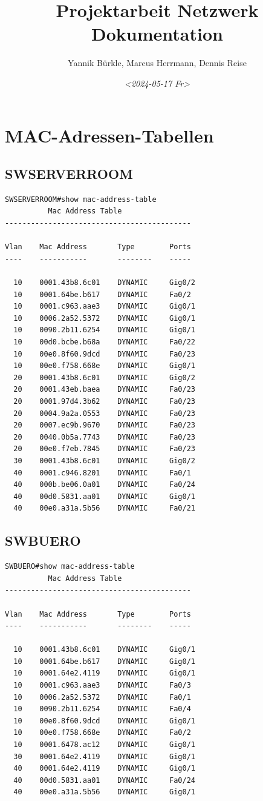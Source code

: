 \documentclass[11pt]{article}
\author{Yannik Bürkle, Marcus Herrmann, Dennis Reise}
\date{\textit{<2024-05-17 Fr>}}
\title{Projektarbeit Netzwerk Dokumentation}
\begin{document}
\maketitle
\tableofcontents

\section{MAC-Adressen-Tabellen}
\label{sec:org6f036d5}
\subsection{SWSERVERROOM}
\label{sec:org0246152}
\begin{verbatim}
SWSERVERROOM#show mac-address-table
          Mac Address Table
-------------------------------------------

Vlan    Mac Address       Type        Ports
----    -----------       --------    -----

  10    0001.43b8.6c01    DYNAMIC     Gig0/2
  10    0001.64be.b617    DYNAMIC     Fa0/2
  10    0001.c963.aae3    DYNAMIC     Gig0/1
  10    0006.2a52.5372    DYNAMIC     Gig0/1
  10    0090.2b11.6254    DYNAMIC     Gig0/1
  10    00d0.bcbe.b68a    DYNAMIC     Fa0/22
  10    00e0.8f60.9dcd    DYNAMIC     Fa0/23
  10    00e0.f758.668e    DYNAMIC     Gig0/1
  20    0001.43b8.6c01    DYNAMIC     Gig0/2
  20    0001.43eb.baea    DYNAMIC     Fa0/23
  20    0001.97d4.3b62    DYNAMIC     Fa0/23
  20    0004.9a2a.0553    DYNAMIC     Fa0/23
  20    0007.ec9b.9670    DYNAMIC     Fa0/23
  20    0040.0b5a.7743    DYNAMIC     Fa0/23
  20    00e0.f7eb.7845    DYNAMIC     Fa0/23
  30    0001.43b8.6c01    DYNAMIC     Gig0/2
  40    0001.c946.8201    DYNAMIC     Fa0/1
  40    000b.be06.0a01    DYNAMIC     Fa0/24
  40    00d0.5831.aa01    DYNAMIC     Gig0/1
  40    00e0.a31a.5b56    DYNAMIC     Fa0/21
\end{verbatim}
\subsection{SWBUERO}
\label{sec:orge25d151}
\begin{verbatim}
SWBUERO#show mac-address-table
          Mac Address Table
-------------------------------------------

Vlan    Mac Address       Type        Ports
----    -----------       --------    -----

  10    0001.43b8.6c01    DYNAMIC     Gig0/1
  10    0001.64be.b617    DYNAMIC     Gig0/1
  10    0001.64e2.4119    DYNAMIC     Gig0/1
  10    0001.c963.aae3    DYNAMIC     Fa0/3
  10    0006.2a52.5372    DYNAMIC     Fa0/1
  10    0090.2b11.6254    DYNAMIC     Fa0/4
  10    00e0.8f60.9dcd    DYNAMIC     Gig0/1
  10    00e0.f758.668e    DYNAMIC     Fa0/2
  10    0001.6478.ac12    DYNAMIC     Gig0/1
  30    0001.64e2.4119    DYNAMIC     Gig0/1
  40    0001.64e2.4119    DYNAMIC     Gig0/1
  40    00d0.5831.aa01    DYNAMIC     Fa0/24
  40    00e0.a31a.5b56    DYNAMIC     Gig0/1
\end{verbatim}
\end{document}
